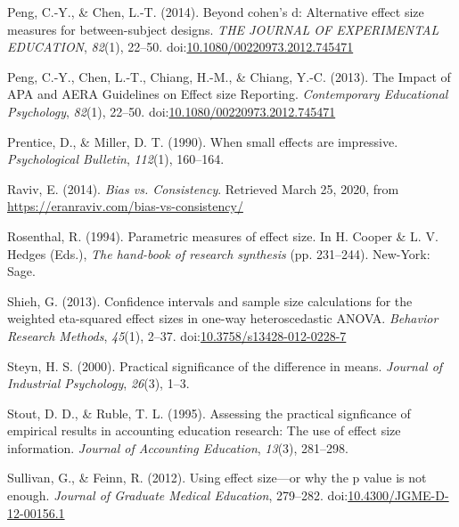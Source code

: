 \documentclass[
  man]{apa6}
\begin{document}
\leavevmode\hypertarget{ref-Peng_and_Chen_2014}{}%
Peng, C.-Y., \& Chen, L.-T. (2014). Beyond cohen's d: Alternative effect size measures for between-subject designs. \emph{THE JOURNAL OF EXPERIMENTAL EDUCATION}, \emph{82}(1), 22--50. doi:\href{https://doi.org/10.1080/00220973.2012.745471}{10.1080/00220973.2012.745471}

\leavevmode\hypertarget{ref-Peng_et_al_2013}{}%
Peng, C.-Y., Chen, L.-T., Chiang, H.-M., \& Chiang, Y.-C. (2013). The Impact of APA and AERA Guidelines on Effect size Reporting. \emph{Contemporary Educational Psychology}, \emph{82}(1), 22--50. doi:\href{https://doi.org/10.1080/00220973.2012.745471}{10.1080/00220973.2012.745471}

\leavevmode\hypertarget{ref-Prentice_Miller_1992}{}%
Prentice, D., \& Miller, D. T. (1990). When small effects are impressive. \emph{Psychological Bulletin}, \emph{112}(1), 160--164.

\leavevmode\hypertarget{ref-Raviv}{}%
Raviv, E. (2014). \emph{Bias vs. Consistency}. Retrieved March 25, 2020, from \url{https://eranraviv.com/bias-vs-consistency/}

\leavevmode\hypertarget{ref-Rosenthal_1994}{}%
Rosenthal, R. (1994). Parametric measures of effect size. In H. Cooper \& L. V. Hedges (Eds.), \emph{The hand-book of research synthesis} (pp. 231--244). New-York: Sage.

\leavevmode\hypertarget{ref-Shieh_2013}{}%
Shieh, G. (2013). Confidence intervals and sample size calculations for the weighted eta-squared effect sizes in one-way heteroscedastic ANOVA. \emph{Behavior Research Methods}, \emph{45}(1), 2--37. doi:\href{https://doi.org/10.3758/s13428-012-0228-7}{10.3758/s13428-012-0228-7}

\leavevmode\hypertarget{ref-Steyn_2000}{}%
Steyn, H. S. (2000). Practical significance of the difference in means. \emph{Journal of Industrial Psychology}, \emph{26}(3), 1--3.

\leavevmode\hypertarget{ref-Stout_Ruble_1995}{}%
Stout, D. D., \& Ruble, T. L. (1995). Assessing the practical signficance of empirical results in accounting education research: The use of effect size information. \emph{Journal of Accounting Education}, \emph{13}(3), 281--298.

\leavevmode\hypertarget{ref-Sullivan_Feinn_2012}{}%
Sullivan, G., \& Feinn, R. (2012). Using effect size---or why the p value is not enough. \emph{Journal of Graduate Medical Education}, 279--282. doi:\href{https://doi.org/10.4300/JGME-D-12-00156.1}{10.4300/JGME-D-12-00156.1}
\end{document}
